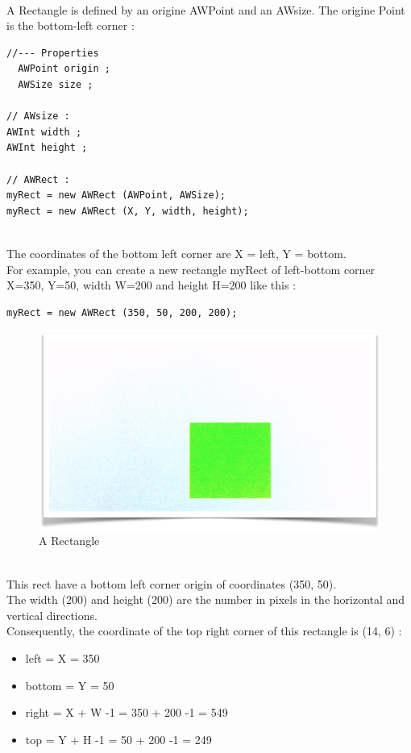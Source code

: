\documentclass[a4paper,11pt]{extarticle}
\begin{document}
~\\ A Rectangle is defined by an origine AWPoint and an AWsize. The origine Point is the bottom-left corner :
\begin{lstlisting}[language=Arduinonl]
//--- Properties
  AWPoint origin ;
  AWSize size ;
  
// AWsize :
AWInt width ;
AWInt height ;

// AWRect :
myRect = new AWRect (AWPoint, AWSize);
myRect = new AWRect (X, Y, width, height);
\end{lstlisting}

~\\The coordinates of the bottom left corner are X = left, Y = bottom.
~\\ For example, you can create a new rectangle myRect of left-bottom corner X=350, Y=50, width W=200 and height H=200 like this :

\begin{lstlisting}[language=Arduinonl]
myRect = new AWRect (350, 50, 200, 200);
\end{lstlisting}

\begin{figure}[htbp]
   \centering
   \includegraphics[scale=0.6]{AWFig6.png} 
   \caption{A Rectangle}
   \label{fig:6 }
\end{figure}

~\\ This rect have a bottom left corner origin of coordinates (350, 50).
~\\ The width (200) and height (200) are the number in pixels in the horizontal and vertical directions.
~\\ Consequently, the coordinate of the top right corner of this rectangle is (14, 6) :
\begin{itemize}
\item left = X = 350
\item bottom = Y = 50
\item right = X + W -1 = 350 + 200 -1 = 549
\item top = Y + H -1 = 50 + 200 -1 = 249
\end{itemize}
\end{document}
